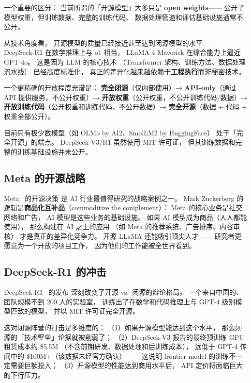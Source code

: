 一个重要的区分：
当前所谓的「开源模型」大多只是 \textbf{open weights}——
公开了模型权重，但训练数据、完整的训练代码、
数据处理管道和评估基础设施通常不公开。

从技术角度看，
开源模型的质量已经接近甚至达到闭源模型的水平——
DeepSeek-R1 在数学推理上与 o1 相当，
LLaMA 4 Maverick 在综合能力上逼近 GPT-4o。
这是因为 LLM 的核心技术
（Transformer 架构、训练方法、数据处理流水线）
已经高度标准化，
真正的差异化越来越依赖于\textbf{工程执行}而非秘密技术。

一个更精确的开放程度光谱是：
\textbf{完全闭源}（仅内部使用）→
\textbf{API-only}（通过 API 提供服务，不公开权重）→
\textbf{开放权重}（公开权重，不公开训练代码/数据）→
\textbf{开放训练代码}（公开权重和训练代码，不公开数据）→
\textbf{完全开源}（数据 + 代码 + 权重全部公开）。

目前只有极少数模型（如 OLMo by AI2、SmolLM2 by HuggingFace）
处于「完全开源」的端点。
DeepSeek-V3/R1 虽然使用 MIT 许可证，
但其训练数据和完整的训练基础设施并未公开。

\subsection{Meta 的开源战略}

Meta~\cite{touvron2023llama,dubey2024llama3} 的开源决策
是 AI 行业最值得研究的战略案例之一。
Mark Zuckerberg 的逻辑是\textbf{商品化互补品}（commoditize the complement）：
Meta 的核心业务是社交网络和广告，
AI 模型是这些业务的基础设施。
如果 AI 模型成为商品（人人都能使用），
那么构建在 AI 之上的应用
（如 Meta 的推荐系统、广告排序、内容审核）
才是真正的差异化竞争力。
开源 LLaMA 还能吸引顶尖人才——
研究者更愿意为一个开放的项目工作，
因为他们的工作能被全世界看到。

\subsection{DeepSeek-R1 的冲击}

DeepSeek-R1~\cite{deepseekr1} 的发布
深刻改变了开源 vs.\ 闭源的辩论格局。
一个来自中国的、团队规模不到 200 人的实验室，
训练出了在数学和代码推理上与 GPT-4 级别模型匹敌的模型，
并以 MIT 许可证完全开源。

这对闭源阵营的打击是多维度的：
（1）如果开源模型能达到这个水平，
那么闭源的「技术壁垒」论据就被削弱了；
（2）DeepSeek-V3 报告的最终预训练 GPU 租赁成本约 \$5.5M
（不含前期研发、数据处理和后训练成本），
远低于 GPT-4 传闻中的 \$100M+（该数据未经官方确认）——
这说明 frontier model 的训练不一定需要巨额投入；
（3）开源模型的性能达到商用水平后，
API 定价将面临巨大的下行压力。

